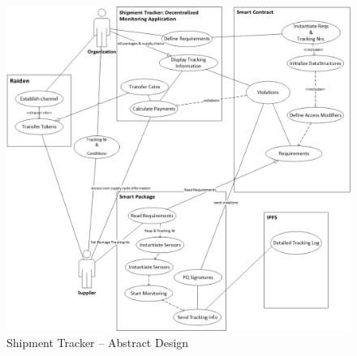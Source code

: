 \begin{figure}[h]
	\centering
    \includegraphics[width=180mm,scale=1]{figs/Abstractdesign}
	\caption{Shipment Tracker – Abstract Design}
	\label{fig:Abstractdesign}
\end{figure}
\clearpage



 
